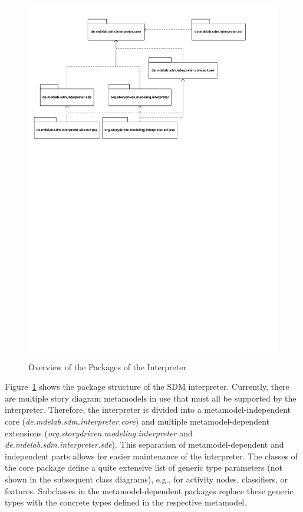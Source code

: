\begin{figure}[htb]
  \centering
  \includegraphics[width=1.0\columnwidth]{./figures/interpreter_packages.pdf}
  \caption{Overview of the Packages of the Interpreter}
  \label{fig:interpreter_packages}
\end{figure}

Figure~\ref{fig:interpreter_packages} shows the package structure of the SDM interpreter.
Currently, there are multiple story diagram metamodels in use that must all be supported by the interpreter. 
Therefore, the interpreter is divided into a metamodel-independent core (\emph{de.mdelab.sdm.interpreter.core}) and multiple metamodel-dependent extensions (\emph{org.storydriven.modeling.interpreter} and \emph{de.mdelab.sdm.interpreter.sde}). 
This separation of metamodel-dependent and independent parts allows for easier maintenance of the interpreter. 
The classes of the core package define a quite extensive list of generic type parameters (not shown in the subsequent class diagrams), e.g., for activity nodes, classifiers, or features. 
Subclasses in the metamodel-dependent packages replace these generic types with the concrete types defined in the respective metamodel.

